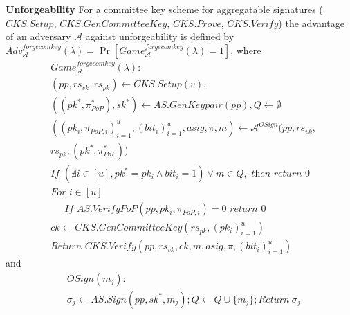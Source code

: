 \noindent \textbf{Unforgeability}  For a committee key scheme for aggregatable signatures 
($\mathit{CKS.Setup}$, $\mathit{CKS.GenCommitteeKey}$, $\mathit{CKS.Prove}$, 
$\mathit{CKS.Verify}$) the advantage of an 
adversary $\mathcal{A}$ against unforgeability is defined by \\
$\mathit{Adv}_{\mathcal{A}}^{\mathit{forgecomkey}}(\lambda) = \Pr[\mathit{Game}^{\mathit{forgecomkey}}_{\mathcal{A}}(\lambda) = 1]$, 
where
\begin{align*}
&\mathit{Game}^{\mathit{forgecomkey}}_{\mathcal{A}}({\lambda}): \\
& (\mathit{pp}, \mathit{rs}_{\mathit{vk}},\mathit{rs}_{\mathit{pk}}) \leftarrow \mathit{CKS.Setup}(v), \\
&((\mathit{pk}^*,\pi^*_{\mathit{PoP}}), \mathit{sk}^*) \leftarrow \mathit{AS.GenKeypair}(\mathit{pp}), Q \leftarrow \emptyset \\
& ((\mathit{pk_i}, \pi_{\mathit{PoP},i})_{i=1}^{u}, (\mathit{bit_i})_{i=1}^u, \mathit{asig}, \pi, m) \leftarrow \mathcal{A}^{\mathit{OSign}}(\mathit{pp},\mathit{rs}_{\mathit{vk}}, \\ &\mathit{rs}_{\mathit{pk}}, (\mathit{pk^*},\pi^*_{\mathit{PoP}})) \\
&\textit{If } (\nexists i  \in [u], \mathit{pk}^* = \mathit{pk_i} \wedge \mathit{bit_i}=1) \vee m \in Q, \textit{ then return } 0 \\
& \textit{For } i \in [u] \\
& \ \ \ \ \ \textit{ If } \mathit{AS.VerifyPoP}(\mathit{pp}, \mathit{pk_i}, \pi_{\mathit{PoP,i}})=0  \textit{ return } 0 \\
& \mathit{ck} \leftarrow \mathit{CKS.GenCommitteeKey}(\mathit{rs}_{\mathit{pk}}, (\mathit{pk_i})_{i=1}^u) \\
& \textit{Return } \mathit{CKS.Verify}(\mathit{pp}, \mathit{rs}_{\mathit{vk}},  \mathit{ck}, m, \mathit{asig}, \pi, (\mathit{bit_i})_{i=1}^u)
\end{align*}
and 
\begin{align*}
& \mathit{OSign}(m_j): \\
& \sigma_j \leftarrow \mathit{AS.Sign}(\mathit{pp}, \mathit{sk}^*, m_j); Q \leftarrow Q \cup \{m_j\}; \textit{Return} \ \sigma_j
\end{align*}


